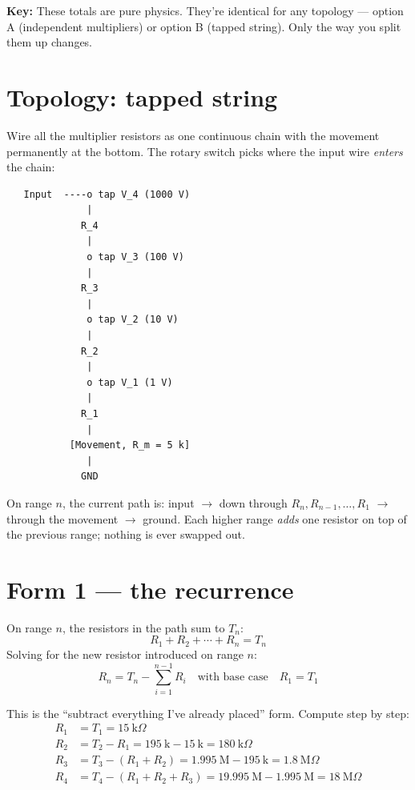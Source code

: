 \documentclass[11pt,a4paper]{article}
\newcommand{\keynote}[1]{\par\textcolor{key}{\textbf{Key:}} #1}
\begin{document}
\keynote{These totals are pure physics. They're identical for any topology --- option A (independent multipliers) or option B (tapped string). Only the way you split them up changes.}

\section*{Topology: tapped string}

Wire all the multiplier resistors as one continuous chain with the movement permanently at the bottom. The rotary switch picks where the input wire \emph{enters} the chain:

\begin{verbatim}
   Input  ----o tap V_4 (1000 V)
              |
             R_4
              |
              o tap V_3 (100 V)
              |
             R_3
              |
              o tap V_2 (10 V)
              |
             R_2
              |
              o tap V_1 (1 V)
              |
             R_1
              |
           [Movement, R_m = 5 k]
              |
             GND
\end{verbatim}

On range $n$, the current path is: input $\to$ down through $R_n, R_{n-1}, \ldots, R_1$ $\to$ through the movement $\to$ ground. Each higher range \emph{adds} one resistor on top of the previous range; nothing is ever swapped out.

\section*{Form 1 --- the recurrence}

On range $n$, the resistors in the path sum to $T_n$:
\[
R_1 + R_2 + \cdots + R_n = T_n
\]
Solving for the new resistor introduced on range $n$:
\[
R_n = T_n - \sum_{i=1}^{n-1} R_i
\quad\text{with base case}\quad R_1 = T_1
\]

This is the ``subtract everything I've already placed'' form. Compute step by step:
\begin{align*}
R_1 &= T_1 = 15\ \text{k}\Omega \\
R_2 &= T_2 - R_1 = 195\ \text{k} - 15\ \text{k} = 180\ \text{k}\Omega \\
R_3 &= T_3 - (R_1 + R_2) = 1.995\ \text{M} - 195\ \text{k} = 1.8\ \text{M}\Omega \\
R_4 &= T_4 - (R_1 + R_2 + R_3) = 19.995\ \text{M} - 1.995\ \text{M} = 18\ \text{M}\Omega
\end{align*}
\end{document}

